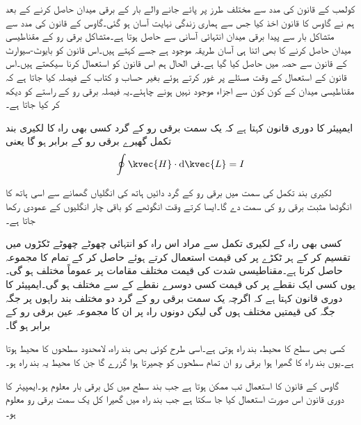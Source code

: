 کولمب کے قانون کی مدد سے مختلف طرز پر پائے جانے والے بار کے برقی میدان حاصل کرنے کے بعد ہم نے گاوس کا قانون اخذ کیا جس سے ہماری زندگی نہایت آسان ہو گئی۔گاوس کے قانون کی مدد سے متشاکل بار سے پیدا برقی میدان انتہائی آسانی سے حاصل ہوتا ہے۔متشاکل برقی رو کے مقناطیسی میدان حاصل کرنے کا بھی اتنا ہی آسان طریقہ موجود ہے جسے  کہتے ہیں۔اس قانون کو بایوٹ-سیوارٹ کے قانون سے حصہ  میں حاصل کیا گیا ہے۔فی الحال ہم اس قانون کو استعمال کرنا سیکھتے ہیں۔اس قانون کے استعمال کے وقت مسئلے پر غور کرتے ہوئے بغیر حساب و کتاب کے فیصلہ کیا جاتا ہے کہ مقناطیسی میدان کے کون کون سے اجزاء موجود نہیں ہونے چاہئے۔یہ فیصلہ برقی رو کے راستے کو دیکھ کر کیا جاتا ہے۔

ایمپیئر کا دوری قانون کہتا ہے کہ یک سمت برقی رو کے گرد کسی بھی راہ  کا لکیری بند تکمل گھیرے برقی رو کے برابر ہو گا یعنی
\begin{align}\label{مساوات_مقناطیسی_ایمپیئر_کا_دوری_قانون}
\oint \kvec{H} \cdot \dif \kvec{L}=I
\end{align}

لکیری بند تکمل کی سمت میں برقی رو کے گرد  دائیں ہاتھ کی انگلیاں گھمانے سے اسی ہاتھ کا انگوٹھا مثبت برقی رو کی سمت دے گا۔ایسا کرتے وقت انگوٹھے کو باقی چار انگلیوں کے عمودی رکھا جاتا ہے۔

کسی بھی راہ  کے لکیری تکمل سے مراد اس راہ  کو انتہائی چھوٹے چھوٹے ٹکڑوں  میں تقسیم کر کے ہر ٹکڑے پر  کی قیمت استعمال کرتے ہوئے  حاصل کر کے تمام  کا مجموعہ حاصل کرنا ہے۔مقناطیسی شدت  کی قیمت مختلف مقامات پر عموماً مختلف ہو گی۔یوں کسی ایک نقطے پر  کی قیمت کسی دوسرے نقطے کے  سے مختلف ہو گی۔ایمپیئر کا دوری قانون کہتا ہے کہ اگرچہ یک سمت برقی رو کے گرد دو مختلف بند راہوں پر جگہ جگہ  کی قیمتیں مختلف ہوں گی لیکن دونوں راہ پر ان کا مجموعہ عین برقی رو کے برابر ہو گا۔

کسی بھی سطح کا محیط، بند راہ ہوتی ہے۔اسی طرح کوئی بھی بند راہ، لامحدود سطحوں کا محیط ہوتا ہے۔یوں بند راہ کا گھیرا ہوا برقی رو ان تمام سطحوں کو چھیرتا ہوا گزرے گا جن کا محیط یہ بند راہ ہو۔

گاوس کے قانون کا استعمال تب ممکن ہوتا ہے جب بند سطح میں کل برقی بار معلوم ہو۔ایمپیئر کا دوری قانون اس صورت استعمال کیا جا سکتا ہے جب  بند راہ میں گھیرا کل یک سمت برقی رو معلوم ہو۔   

